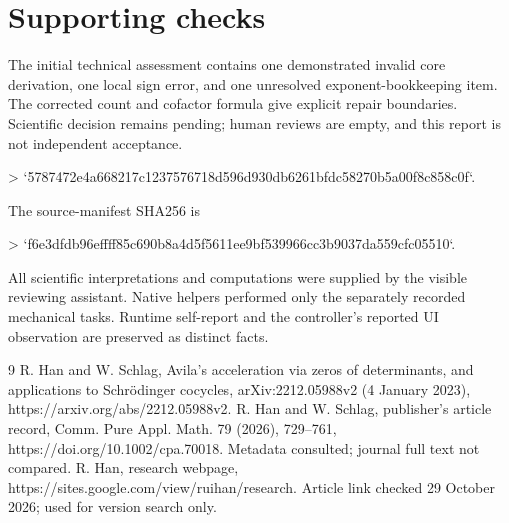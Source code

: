 \documentclass[10pt]{article}
\begin{document}
\section*{Supporting checks}
The initial technical assessment contains one demonstrated invalid core derivation, one local sign error, and one unresolved exponent-bookkeeping item. The corrected count and cofactor formula give explicit repair boundaries. Scientific decision remains pending; human reviews are empty, and this report is not independent acceptance.\par
> `5787472e4a668217c1237576718d596d930db6261bfdc58270b5a00f8c858c0f`.\par
The source-manifest SHA256 is\par
> `f6e3dfdb96effff85c690b8a4d5f5611ee9bf539966cc3b9037da559cfc05510`.\par
All scientific interpretations and computations were supplied by the visible reviewing assistant. Native helpers performed only the separately recorded mechanical tasks. Runtime self-report and the controller’s reported UI observation are preserved as distinct facts.\par
9 R. Han and W. Schlag, Avila’s acceleration via zeros of determinants, and applications to Schrödinger cocycles, arXiv:2212.05988v2 (4 January 2023), https://arxiv.org/abs/2212.05988v2. R. Han and W. Schlag, publisher’s article record, Comm. Pure Appl. Math. 79 (2026), 729–761, https://doi.org/10.1002/cpa.70018. Metadata consulted; journal full text not compared. R. Han, research webpage, https://sites.google.com/view/ruihan/research. Article link checked 29 October 2026; used for version search only.\par
\end{document}
